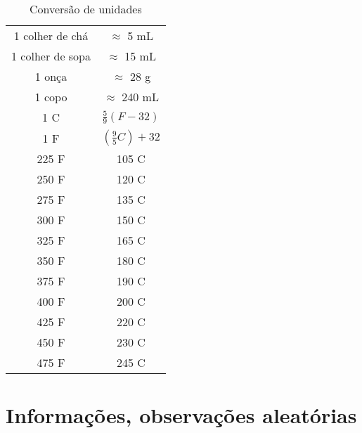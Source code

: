 \begin{table}[h]
	\centering
	\begin{tabular}[h]{c c}
		\hline
		1 colher de chá  & $\approx$ 5 mL                    \\
		1 colher de sopa & $\approx$ 15 mL                   \\
		1 onça           & $\approx$ 28 g                    \\
		1 copo           & $\approx$ 240 mL                  \\
		\hline
		1 \grau C        & $\frac{5}{9} \left( F-32 \right)$ \\
		1 \grau F        & $\left(\frac{9}{5} C\right)+32$   \\
		\hline
		225 \grau F      & 105 \grau C                       \\
		250 \grau F      & 120 \grau C                       \\
		275 \grau F      & 135 \grau C                       \\
		300 \grau F      & 150 \grau C                       \\
		325 \grau F      & 165 \grau C                       \\
		350 \grau F      & 180 \grau C                       \\
		375 \grau F      & 190 \grau C                       \\
		400 \grau F      & 200 \grau C                       \\
		425 \grau F      & 220 \grau C                       \\
		450 \grau F      & 230 \grau C                       \\
		475 \grau F      & 245 \grau C                       \\
		\hline
	\end{tabular}
	\caption{Conversão de unidades}
	\label{tab:conversao_unidades}
\end{table}

\clearpage
\section{Informações, observações aleatórias}

